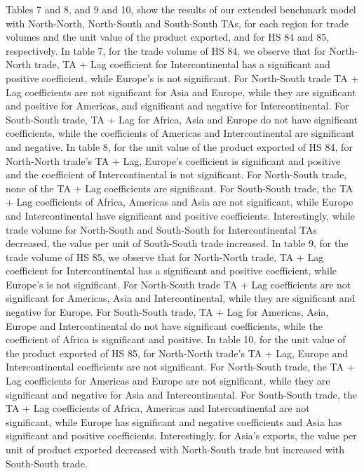 \documentclass[12pt]{article}%
\begin{document}
Tables 7 and 8, and 9 and 10, show the results of our extended benchmark
model with North-North, North-South and South-South TAs, for each region
for trade volumes and the unit value of the product exported, and for HS
84 and 85, respectively. In table 7, for the trade volume of HS 84, we
observe that for North-North trade, TA + Lag coefficient for
Intercontinental has a significant and positive coefficient, while
Europe's is not significant. For North-South trade TA + Lag coefficients
are not significant for Asia and Europe, while they are significant and
positive for Americas, and significant and negative for
Intercontinental. For South-South trade, TA + Lag for Africa, Asia and
Europe do not have significant coefficients, while the coefficients of
Americas and Intercontinental are significant and negative. In table 8,
for the unit value of the product exported of HS 84, for North-North
trade's TA + Lag, Europe's coefficient is significant and positive and
the coefficient of Intercontinental is not significant. For North-South
trade, none of the TA + Lag coefficients are significant. For
South-South trade, the TA + Lag coefficients of Africa, Americas and
Asia are not significant, while Europe and Intercontinental have
significant and positive coefficients. Interestingly, while trade volume
for North-South and South-South for Intercontinental TAs decreased, the
value per unit of South-South trade increased. In table 9, for the trade
volume of HS 85, we observe that for North-North trade, TA + Lag
coefficient for Intercontinental has a significant and positive
coefficient, while Europe's is not significant. For North-South trade TA
+ Lag coefficients are not significant for Americas, Asia and
Intercontinental, while they are significant and negative for Europe.
For South-South trade, TA + Lag for Americas, Asia, Europe and
Intercontinental do not have significant coefficients, while the
coefficient of Africa is significant and positive. In table 10, for the
unit value of the product exported of HS 85, for North-North trade's TA
+ Lag, Europe and Intercontinental coefficients are not significant. For
North-South trade, the TA + Lag coefficients for Americas and Europe are
not significant, while they are significant and negative for Asia and
Intercontinental. For South-South trade, the TA + Lag coefficients of
Africa, Americas and Intercontinental are not significant, while Europe
has significant and negative coefficients and Asia has significant and
positive coefficients. Interestingly, for Asia's exports, the value per
unit of product exported decreased with North-South trade but increased
with South-South trade.
\end{document}
